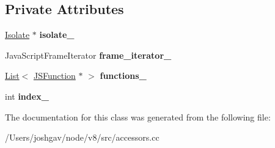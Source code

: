\subsection*{Private Attributes}
\begin{DoxyCompactItemize}
\item 
\hyperlink{classv8_1_1internal_1_1_isolate}{Isolate} $\ast$ {\bfseries isolate\+\_\+}\hypertarget{classv8_1_1internal_1_1_frame_function_iterator_af9d91ea303110a7f9f1453036941463a}{}\label{classv8_1_1internal_1_1_frame_function_iterator_af9d91ea303110a7f9f1453036941463a}

\item 
Java\+Script\+Frame\+Iterator {\bfseries frame\+\_\+iterator\+\_\+}\hypertarget{classv8_1_1internal_1_1_frame_function_iterator_ac4d7b5229d29a62738318e370cfdfef5}{}\label{classv8_1_1internal_1_1_frame_function_iterator_ac4d7b5229d29a62738318e370cfdfef5}

\item 
\hyperlink{classv8_1_1internal_1_1_list}{List}$<$ \hyperlink{classv8_1_1internal_1_1_j_s_function}{J\+S\+Function} $\ast$ $>$ {\bfseries functions\+\_\+}\hypertarget{classv8_1_1internal_1_1_frame_function_iterator_a094adb36c037592b7ffb3cb6966eae40}{}\label{classv8_1_1internal_1_1_frame_function_iterator_a094adb36c037592b7ffb3cb6966eae40}

\item 
int {\bfseries index\+\_\+}\hypertarget{classv8_1_1internal_1_1_frame_function_iterator_ab246299fae8359008784ddef7c7cfb35}{}\label{classv8_1_1internal_1_1_frame_function_iterator_ab246299fae8359008784ddef7c7cfb35}

\end{DoxyCompactItemize}


The documentation for this class was generated from the following file\+:\begin{DoxyCompactItemize}
\item 
/\+Users/joshgav/node/v8/src/accessors.\+cc\end{DoxyCompactItemize}
